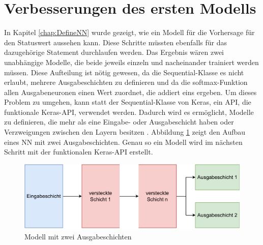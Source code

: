 \section{Verbesserungen des ersten Modells}
\label{chap:VerbesserungenNN}

In Kapitel \ref*{chap:DefineNN} wurde gezeigt, wie ein Modell für die Vorhersage für den Statuswert aussehen kann. Diese Schritte müssten ebenfalls für das dazugehörige Statement
durchlaufen werden. Das Ergebnis wären zwei unabhängige Modelle, die beide jeweils einzeln und nacheinander trainiert werden müssen. Diese Aufteilung ist nötig gewesen,
da die \glqq Sequential\grqq{}-Klasse es nicht erlaubt, mehrere Ausgabeschichten zu definieren und da die \glqq softmax\grqq{}-Funktion allen Ausgabeneuronen 
einen Wert zuordnet, die addiert eins ergeben. Um dieses Problem zu umgehen, kann statt der \glqq Sequential\grqq{}-Klasse von Keras, 
ein \ac{API}, die funktionale Keras-\ac{API}, verwendet werden. 
Dadurch wird es ermöglicht, Modelle zu definieren, die mehr als eine Eingabe- oder Ausgabeschicht haben oder Verzweigungen zwischen den Layern besitzen \cite[vgl. S.299f.]{DL_PY}. 
Abbildung \ref*{fig:FunktionaleAPI} zeigt den Aufbau eines \ac{NN} mit zwei Ausgabeschichten. Genau so ein Modell wird im nächsten Schritt mit der funktionalen Keras-\ac{API} erstellt.

\begin{figure}[H]
    \centering
    \includegraphics[width=\textwidth]{abbildungen/NN_funktionaleAPI.pdf}
    \caption{Modell mit zwei Ausgabeschichten}
    \label{fig:FunktionaleAPI}
\end{figure}

